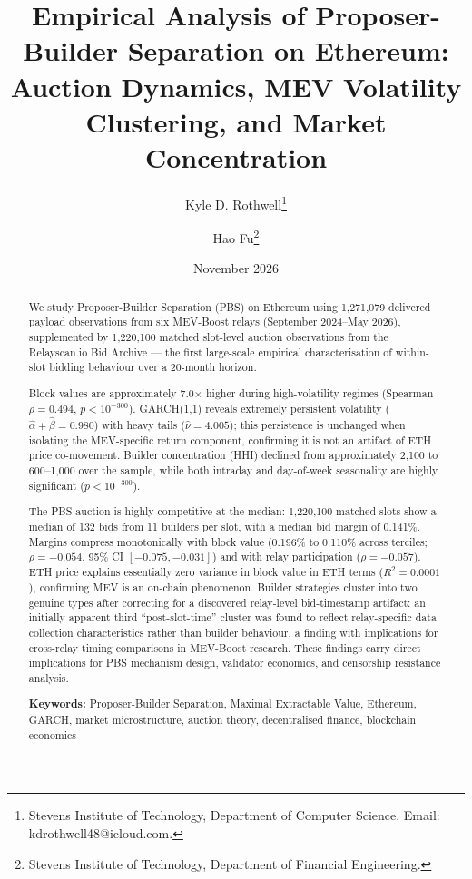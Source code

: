 \documentclass[11pt]{article}
\title{Empirical Analysis of Proposer-Builder Separation on Ethereum: \\
Auction Dynamics, MEV Volatility Clustering, and Market Concentration}
\author[1]{Kyle D. Rothwell\thanks{Stevens Institute of Technology, Department of Computer Science. Email: kdrothwell48@icloud.com.}}
\author[2]{Hao Fu\thanks{Stevens Institute of Technology, Department of Financial Engineering.}}
\affil[1,2]{Working Paper --- Stevens Institute of Technology}
\date{November 2026}
\begin{document}
\maketitle

\begin{abstract}
We study Proposer-Builder Separation (PBS) on Ethereum using 1,271,079
delivered payload observations from six MEV-Boost relays (September
2024--May 2026), supplemented by 1,220,100 matched slot-level auction
observations from the Relayscan.io Bid Archive \citep{relayscan2024} --- the
first large-scale empirical characterisation of within-slot bidding behaviour
over a 20-month horizon.

Block values are approximately 7.0$\times$ higher during high-volatility
regimes (Spearman $\rho = 0.494$, $p < 10^{-300}$). GARCH(1,1) reveals
extremely persistent volatility ($\hat\alpha + \hat\beta = 0.980$) with heavy
tails ($\hat\nu = 4.005$); this persistence is unchanged when isolating the
MEV-specific return component, confirming it is not an artifact of ETH price
co-movement. Builder concentration (HHI) declined from approximately 2,100 to
600--1,000 over the sample, while both intraday and day-of-week seasonality
are highly significant ($p < 10^{-300}$).

The PBS auction is highly competitive at the median: 1,220,100 matched slots
show a median of 132 bids from 11 builders per slot, with a median bid margin
of 0.141\%. Margins compress monotonically with block value (0.196\% to
0.110\% across terciles; $\rho = -0.054$, 95\% CI $[-0.075,-0.031]$) and with
relay participation ($\rho = -0.057$). ETH price explains essentially zero
variance in block value in ETH terms ($R^2 = 0.0001$), confirming MEV is an
on-chain phenomenon. Builder strategies cluster into two genuine types after
correcting for a discovered relay-level bid-timestamp artifact: an initially
apparent third ``post-slot-time'' cluster was found to reflect relay-specific
data collection characteristics rather than builder behaviour, a finding
with implications for cross-relay timing comparisons in MEV-Boost research.
These findings carry direct implications for PBS mechanism design, validator
economics, and censorship resistance analysis.

\vspace{1em}
\noindent\textbf{Keywords:} Proposer-Builder Separation, Maximal Extractable
Value, Ethereum, GARCH, market microstructure, auction theory, decentralised
finance, blockchain economics
\end{abstract}
\end{document}
